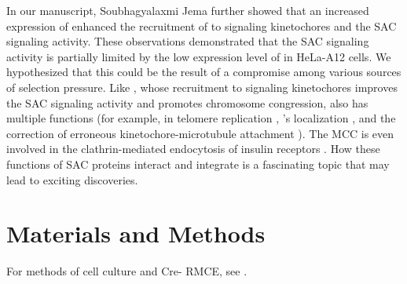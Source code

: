 In our manuscript, Soubhagyalaxmi Jema further showed that an increased expression of  enhanced the recruitment of  to signaling kinetochores and the SAC signaling activity. These observations demonstrated that the SAC signaling activity is partially limited by the low expression level of  in HeLa-A12 cells. We hypothesized that this could be the result of a compromise among various sources of selection pressure. Like , whose recruitment to signaling kinetochores improves the SAC signaling activity and promotes chromosome congression,  also has multiple functions (for example, in telomere replication \cite{BUB3-BUB1_TelomereReplication}, 's localization \cite{CENPU+BUB1-PLK1}, and the correction of erroneous kinetochore-microtubule attachment \cite{BUB1_pH2A_AuroraB}). The MCC is even involved in the clathrin-mediated endocytosis of insulin receptors \cite{MCC_IREndocytosis, Choi2019}. How these functions of SAC proteins interact and integrate is a fascinating topic that may lead to exciting discoveries. %

\section{Materials and Methods}
For methods of cell culture and Cre- RMCE, see .

